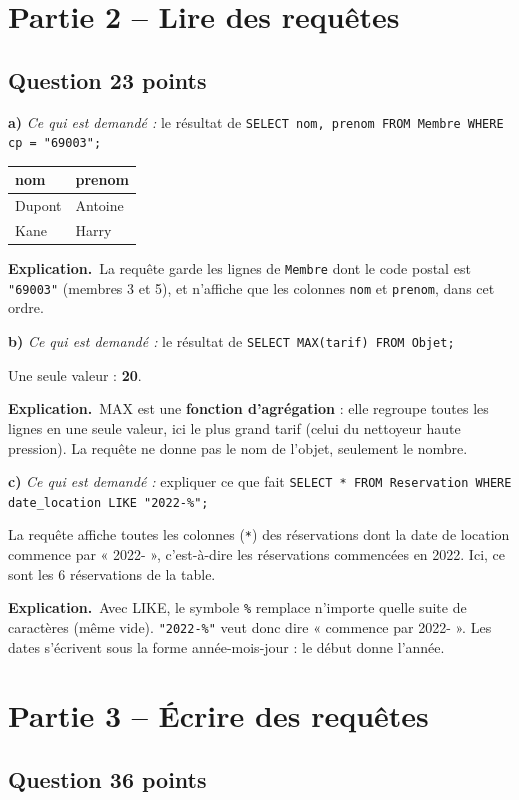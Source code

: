 \documentclass[11pt, a4paper]{exam}
\newcommand{\code}[1]{\texttt{#1}}
\newcommand{\Qt}[2]{\subsection*{#1\hfill{\normalfont\small #2}}}
\newcommand{\rappel}[1]{\noindent\textit{Ce qui est demandé :} #1\par\smallskip}
\newcommand{\explication}{\noindent\textbf{Explication.}\ }
\newcommand{\sql}[1]{\textsc{#1}}
\begin{document}
\section*{Partie 2 -- Lire des requêtes}
\Qt{Question 2}{3 points}

\textbf{a)} \rappel{le résultat de \code{SELECT nom, prenom FROM Membre WHERE cp = "69003";}}
\begin{reponse}
\begin{tabular}{|l|l|}\hline
nom & prenom \\\hline
Dupont & Antoine \\
Kane & Harry \\\hline
\end{tabular}
\end{reponse}
\explication La requête garde les lignes de \code{Membre} dont le code postal est \code{"69003"} (membres 3 et 5), et n'affiche que les colonnes \code{nom} et \code{prenom}, dans cet ordre.

\textbf{b)} \rappel{le résultat de \code{SELECT MAX(tarif) FROM Objet;}}
\begin{reponse}
Une seule valeur : \textbf{20}.
\end{reponse}
\explication \sql{MAX} est une \textbf{fonction d'agrégation} : elle regroupe toutes les lignes en une seule valeur, ici le plus grand tarif (celui du nettoyeur haute pression). La requête ne donne pas le nom de l'objet, seulement le nombre.

\textbf{c)} \rappel{expliquer ce que fait \code{SELECT * FROM Reservation WHERE date\_location LIKE "2022-\%";}}
\begin{reponse}
La requête affiche toutes les colonnes (\code{*}) des réservations dont la date de location commence par « 2022- », c'est-à-dire les réservations commencées en 2022. Ici, ce sont les 6 réservations de la table.
\end{reponse}
\explication Avec \sql{LIKE}, le symbole \code{\%} remplace n'importe quelle suite de caractères (même vide). \code{"2022-\%"} veut donc dire « commence par 2022- ». Les dates s'écrivent sous la forme année-mois-jour : le début donne l'année.

\section*{Partie 3 -- Écrire des requêtes}
\Qt{Question 3}{6 points}
\end{document}
